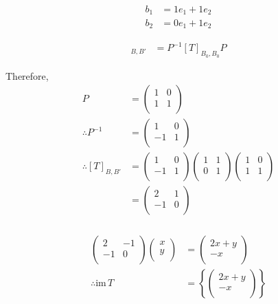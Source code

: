 \documentclass[fleqn, a4paper, twocolumn, draft]{article}
\theoremstyle{definition}
\theoremstyle{theorem}
\theoremstyle{remark}
\newcommand{\im}{\mathrm{im}\,}
\numberwithin{corollary}{theorem}
\numberwithin{equation}{theorem}
\begin{document}
\begin{align*}
	b_1 &= 1 e_1 + 1 e_2\\
	b_2 &= 0 e_1 + 1 e_2
\end{align*}

\begin{align*}
	[T]_{B, B'} &= P^{-1} [T]_{B_0, B_0} P
\end{align*}

Therefore,
\begin{align*}
	P &=
		\begin{pmatrix}
			1 & 0\\
			1 & 1\\
		\end{pmatrix}\\
	\therefore P^{-1} &= 
		\begin{pmatrix}
			1 & 0\\
			-1 & 1\\
		\end{pmatrix}\\
	\therefore [T]_{B, B'} &= 
		\begin{pmatrix}
		1 & 0\\
		-1 & 1\\
		\end{pmatrix}
		\begin{pmatrix}
			1 & 1\\
			0 & 1\\
		\end{pmatrix}
		\begin{pmatrix}
			1 & 0\\
			1 & 1\\
		\end{pmatrix}\\
	&= 
		\begin{pmatrix}
			2 & 1\\
			-1 & 0\\
		\end{pmatrix}
\end{align*}

\subsubsection{}

\begin{align*}
		\begin{pmatrix}
			2 & -1\\
			-1 & 0\\
		\end{pmatrix}
		\begin{pmatrix}
			x\\
			y\\
		\end{pmatrix}
	&=
		\begin{pmatrix}
			2x + y\\
			-x\\
		\end{pmatrix}\\
	\therefore \im T & = 
		\left\lbrace
			\begin{pmatrix}
				2x + y\\
				-x\\
			\end{pmatrix}
		\right\rbrace
\end{align*}
\end{document}
